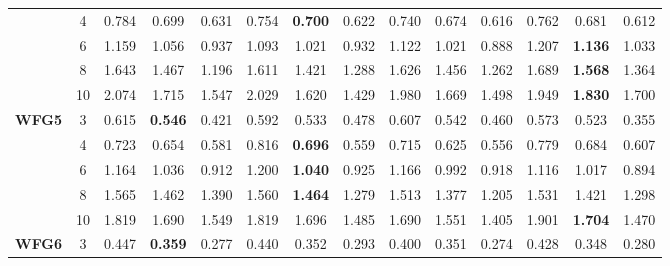 \documentclass[onecolumn,10pt]{asme2ej}
\begin{document}
\begin{table}[!htb]
\begin{tabular}{|c|c|c|c|c|c|c|c|c|c|c|c|c|c|}
	& 4          & 0.784         & 0.699          & 0.631          & 0.754         & \textbf{0.700} & 0.622          & 0.740         & 0.674          & 0.616          & 0.762         & 0.681          & 0.612          \\ \cline{2-14} 
	& 6          & 1.159         & 1.056          & 0.937          & 1.093         & 1.021          & 0.932          & 1.122         & 1.021          & 0.888          & 1.207         & \textbf{1.136} & 1.033          \\ \cline{2-14} 
	& 8          & 1.643         & 1.467          & 1.196          & 1.611         & 1.421          & 1.288          & 1.626         & 1.456          & 1.262          & 1.689         & \textbf{1.568} & 1.364          \\ \cline{2-14} 
	& 10         & 2.074         & 1.715          & 1.547          & 2.029         & 1.620          & 1.429          & 1.980         & 1.669          & 1.498          & 1.949         & \textbf{1.830} & 1.700          \\ \hline
	\multirow{5}{*}{\textbf{WFG5}} & 3          & 0.615         & \textbf{0.546} & 0.421          & 0.592         & 0.533          & 0.478          & 0.607         & 0.542          & 0.460          & 0.573         & 0.523          & 0.355          \\ \cline{2-14} 
	& 4          & 0.723         & 0.654          & 0.581          & 0.816         & \textbf{0.696} & 0.559          & 0.715         & 0.625          & 0.556          & 0.779         & 0.684          & 0.607          \\ \cline{2-14} 
	& 6          & 1.164         & 1.036          & 0.912          & 1.200         & \textbf{1.040} & 0.925          & 1.166         & 0.992          & 0.918          & 1.116         & 1.017          & 0.894          \\ \cline{2-14} 
	& 8          & 1.565         & 1.462          & 1.390          & 1.560         & \textbf{1.464} & 1.279          & 1.513         & 1.377          & 1.205          & 1.531         & 1.421          & 1.298          \\ \cline{2-14} 
	& 10         & 1.819         & 1.690          & 1.549          & 1.819         & 1.696          & 1.485          & 1.690         & 1.551          & 1.405          & 1.901         & \textbf{1.704} & 1.470          \\ \hline
	\multirow{5}{*}{\textbf{WFG6}} & 3          & 0.447         & \textbf{0.359} & 0.277          & 0.440         & 0.352          & 0.293          & 0.400         & 0.351          & 0.274          & 0.428         & 0.348          & 0.280          \\ \cline{2-14} 

\end{tabular}
\end{table}
\end{document}
